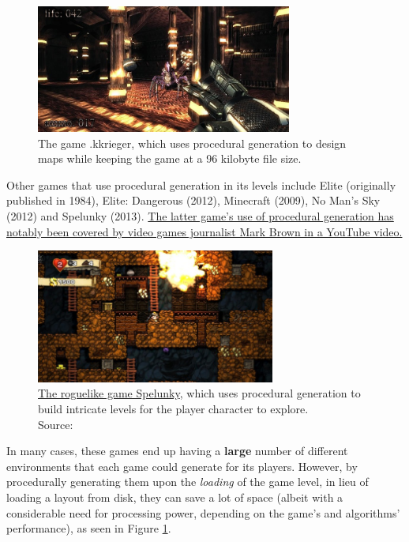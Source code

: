 \begin{figure}[H]
	\centering
	\includegraphics[width=0.75\textwidth]{Images/kkrieger.png}
	\caption{The game .kkrieger, which uses procedural generation to design maps while keeping the game at a 96 kilobyte file size.\cite{pcgvirtualworld}}
	\label{fig:kkrieger}
\end{figure}

Other games that use procedural generation in its levels include Elite (originally published in 1984), Elite: Dangerous (2012), Minecraft (2009), No Man's Sky (2012) and Spelunky (2013). \href{https://youtu.be/Uqk5Zf0tw3o}{The latter game's use of procedural generation has notably been covered by video games journalist Mark Brown in a YouTube video.}\cite{spelunkyvid}

\begin{figure}[H]
	\centering
	\includegraphics[width=0.7\textwidth]{Images/spelunky.jpg}
	\caption{\href{https://spelunkyworld.com/}{The roguelike game Spelunky}, which uses procedural generation to build intricate levels for the player character to explore.\\Source: }
	\label{fig:spelunky}
\end{figure}

In many cases, these games end up having a \textbf{large} number of different environments that each game could generate for its players. However, by procedurally generating them upon the \textit{loading} of the game level, in lieu of loading a layout from disk, they can save a lot of space (albeit with a considerable need for processing power, depending on the game's and algorithms' performance), as seen in Figure \ref{fig:kkrieger}.

